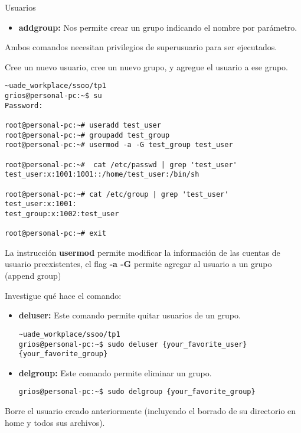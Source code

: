 \begin{section}{Usuarios}
\begin{itemize}
\item \textbf{addgroup:}
	Nos permite crear un grupo indicando el nombre por parámetro.
\end{itemize}

Ambos comandos necesitan privilegios de superusuario para ser ejecutados.


\begin{quoting}
Cree un nuevo usuario, cree un nuevo grupo, y agregue el usuario a ese grupo.
\end{quoting}


\begin{lstlisting}[style=Ubuntu]
~uade_workplace/ssoo/tp1
grios@personal-pc:~$ su
Password: 

root@personal-pc:~# useradd test_user
root@personal-pc:~# groupadd test_group
root@personal-pc:~# usermod -a -G test_group test_user

root@personal-pc:~#  cat /etc/passwd | grep 'test_user'
test_user:x:1001:1001::/home/test_user:/bin/sh

root@personal-pc:~# cat /etc/group | grep 'test_user'
test_user:x:1001:
test_group:x:1002:test_user

root@personal-pc:~# exit
\end{lstlisting}

La instrucción \textbf{usermod} permite modificar la información de las cuentas de usuario preexistentes, el flag \textbf{-a -G} permite agregar al usuario a un grupo (append group)

\begin{quoting}
Investigue qué hace el comando:
\end{quoting}

\begin{itemize}
\item \textbf{deluser:}
Este comando permite quitar usuarios de un grupo.
\begin{lstlisting}[style=Ubuntu]
~uade_workplace/ssoo/tp1
grios@personal-pc:~$ sudo deluser {your_favorite_user} {your_favorite_group} 
\end{lstlisting}

\item \textbf{delgroup:}
Este comando permite eliminar un grupo.
\begin{lstlisting}[style=Ubuntu]
grios@personal-pc:~$ sudo delgroup {your_favorite_group} 
\end{lstlisting}
\end{itemize}

\begin{quoting}
Borre el usuario creado anteriormente (incluyendo el borrado de su directorio en home y todos sus
archivos).
\end{quoting}


\end{section}
